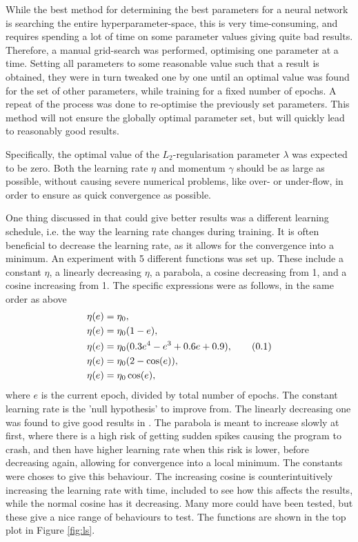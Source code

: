 \documentclass[multicolumn, 9pt]{extarticle}
\newcommand\numberthis{\addtocounter{equation}{1}\tag{\theequation}}
\begin{document}
While the best method for determining the best parameters for a neural network is searching the entire hyperparameter-space, this is very time-consuming, and requires spending a lot of time on some parameter values giving quite bad results. Therefore, a manual grid-search was performed, optimising one parameter at a time. Setting all parameters to some reasonable value such that a result is obtained, they were in turn tweaked one by one until an optimal value was found for the set of other parameters, while training for a fixed number of epochs. A repeat of the process was done to re-optimise the previously set parameters. This method will not ensure the globally optimal parameter set, but will quickly lead to reasonably good results.

Specifically, the optimal value of the $L_2$-regularisation parameter $\lambda$ was expected to be zero. Both the learning rate $\eta$ and momentum $\gamma$ should be as large as possible, without causing severe numerical problems, like over- or under-flow, in order to ensure as quick convergence as possible.

One thing discussed in \cite{p2HO} that could give better results was a different learning schedule, i.e. the way the learning rate changes during training. It is often beneficial to decrease the learning rate, as it allows for the convergence into a minimum. An experiment with 5 different functions was set up. These include a constant $\eta$, a linearly decreasing $\eta$, a parabola, a cosine decreasing from 1, and a cosine increasing from 1.
The specific expressions were as follows, in the same order as above
\begin{align*}\label{eq:ls}
	\eta(e) & = \eta_0,
	\\
	\eta(e) & = \eta_0 (1 - e),
	\\
	\eta(e) & = \eta_0 (0.3e^4-e^3+0.6e+0.9), \numberthis
	\\
	\eta(e) & = \eta_0 (2 - \cos(e)),
	\\
	\eta(e) & = \eta_0 \cos(e),
\end{align*}
where $e$ is the current epoch, divided by total number of epochs. The constant learning rate is the 'null hypothesis' to improve from. The linearly decreasing one was found to give good results in \cite{p2HO}. The parabola is meant to increase slowly at first, where there is a high risk of getting sudden spikes causing the program to crash, and then have higher learning rate when this risk is lower, before decreasing again, allowing for convergence into a local minimum. The constants were choses to give this behaviour. The increasing cosine is counterintuitively increasing the learning rate with time, included to see how this affects the results, while the normal cosine has it decreasing. Many more could have been tested, but these give a nice range of behaviours to test. The functions are shown in the top plot in Figure \ref{fig:ls}.
\end{document}
